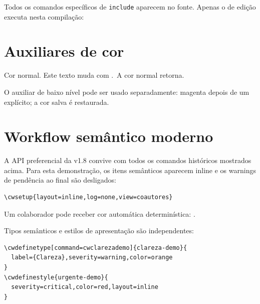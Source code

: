 \documentclass[11pt]{article}
\begin{document}
Todos os comandos específicos de \texttt{include} aparecem no fonte. Apenas
o de edição executa nesta compilação:


\section{Auxiliares de cor}

Cor normal. Este texto muda com
\texttt{\string\cwcolor}.\cwrestorecolor\ A cor normal retorna.

O auxiliar de baixo nível pode ser usado separadamente:
\cwsavecolor
\color{magenta}magenta depois de um \texttt{\string\color} explícito;
\cwrestorecolor
a cor salva é restaurada.


\section{Workflow semântico moderno}

A API preferencial da v1.8 convive com todos os comandos históricos mostrados
acima. Para esta demonstração, os itens semânticos aparecem inline e os
warnings de pendência ao final são desligados:

\begin{verbatim}
\cwsetup{layout=inline,log=none,view=coautores}
\end{verbatim}


Um colaborador pode receber cor automática determinística:
.

Tipos semânticos e estilos de apresentação são independentes:

\begin{verbatim}
\cwdefinetype[command=cwclarezademo]{clareza-demo}{
  label={Clareza},severity=warning,color=orange
}
\cwdefinestyle{urgente-demo}{
  severity=critical,color=red,layout=inline
}
\end{verbatim}



\end{document}

